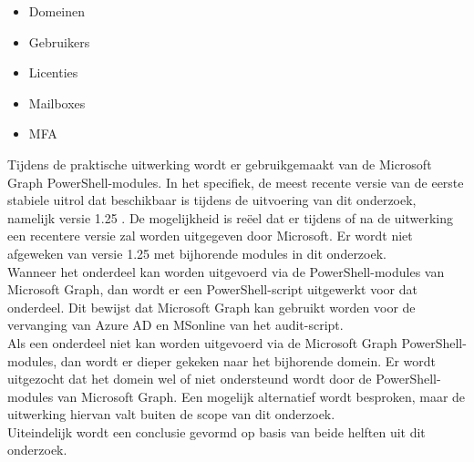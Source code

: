 \begin{itemize}
    \item Domeinen
    \item Gebruikers
    \item Licenties
    \item Mailboxes
    \item \ac{MFA}
\end{itemize}

Tijdens de praktische uitwerking wordt er gebruikgemaakt van de Microsoft Graph PowerShell-modules. In het specifiek, de meest recente versie van de eerste stabiele uitrol dat beschikbaar is tijdens de uitvoering van dit onderzoek, namelijk versie 1.25 \autocite{Microsoft2023k}. De mogelijkheid is reëel dat er tijdens of na de uitwerking een recentere versie zal worden uitgegeven door Microsoft. Er wordt niet afgeweken van versie 1.25 met bijhorende modules in dit onderzoek. \\  

Wanneer het onderdeel kan worden uitgevoerd via de PowerShell-modules van Microsoft Graph, dan wordt er een PowerShell-script uitgewerkt voor dat onderdeel. Dit bewijst dat Microsoft Graph kan gebruikt worden voor de vervanging van Azure \ac{AD} en MSonline van het audit-script. \\

Als een onderdeel niet kan worden uitgevoerd via de Microsoft Graph PowerShell-modules, dan wordt er dieper gekeken naar het bijhorende domein. Er wordt uitgezocht dat het domein wel of niet ondersteund wordt door de PowerShell-modules van Microsoft Graph. Een mogelijk alternatief wordt besproken, maar de uitwerking hiervan valt buiten de scope van dit onderzoek. \\

Uiteindelijk wordt een conclusie gevormd op basis van beide helften uit dit onderzoek. 